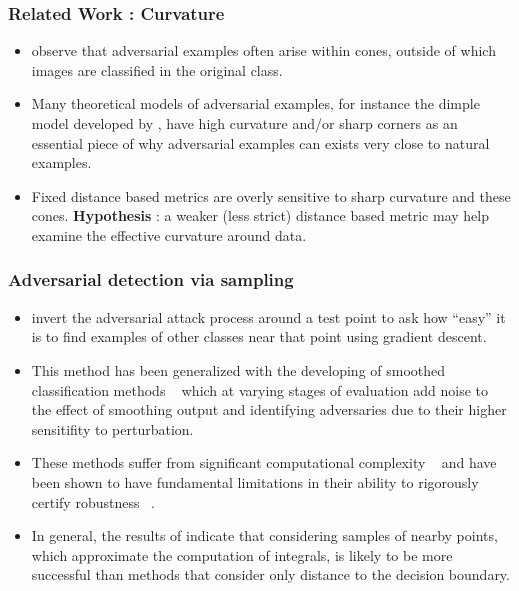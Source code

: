 \begin{frame}
\frametitle{Related Work : Curvature}
\begin{itemize}
\item \citet{roth19aodds} observe that adversarial examples often arise within cones,
  outside of which images are classified in the original class.

  \item Many theoretical models of
 adversarial examples, for instance the dimple model developed by
 \citet{shamir2021}, have high curvature and/or sharp corners as an
 essential piece of why adversarial examples can exists very close to
 natural examples.
 \item Fixed distance based metrics are overly sensitive to sharp
   curvature and these cones. \textbf{Hypothesis} : a weaker (less
   strict) distance based metric may help examine the effective
   curvature around data.

 \end{itemize}
\end{frame}


\begin{frame}
  \frametitle {Adversarial detection via sampling}
  \begin{itemize}
    
    \item \citet{yu2019new} invert the adversarial attack process
      around a test point to
      ask how ``easy'' it is to find examples of other classes near
      that point using gradient descent.
      \item This method has been generalized with
 the developing of smoothed classification methods
 ~\citep{cohen2019certified, lecuyer2019certified, li2019certified}
 which at varying stages of evaluation add noise to the effect of
 smoothing output and identifying adversaries due to their higher
 sensitifity to perturbation.
 \item These methods suffer from significant
 computational complexity ~\citep{kumar2020curse} and have been shown
 to have fundamental limitations in their ability to rigorously certify
 robustness ~\citep{blum2020random, yang2020randomized}.

 \item In general, the results of \citet{yu2019new} indicate that considering samples of nearby points, which approximate the computation of integrals, is likely to be more successful than methods that consider only distance to the decision boundary.
 \end{itemize}
\end{frame}

